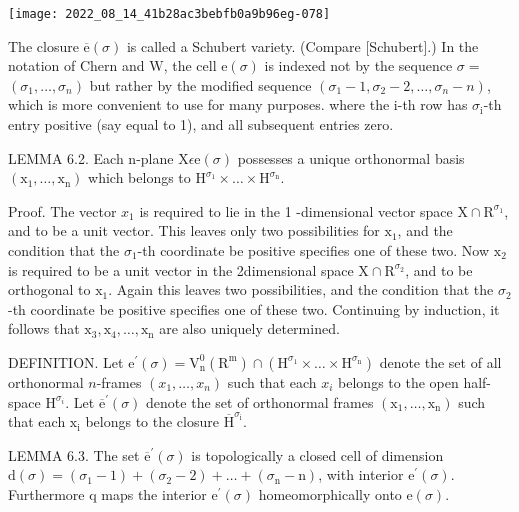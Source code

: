\documentclass[10pt]{article}
\begin{document}
\texttt{[image: 2022\_08\_14\_41b28ac3bebfb0a9b96eg-078]}

The closure $\overline{\mathrm{e}}(\sigma)$ is called a Schubert variety. (Compare [Schubert].) In the notation of Chern and $\mathrm{W}$, the cell $\mathrm{e}(\sigma)$ is indexed not by the sequence $\sigma=$ $\left(\sigma_{1}, \ldots, \sigma_{n}\right)$ but rather by the modified sequence $\left(\sigma_{1}-1, \sigma_{2}-2, \ldots, \sigma_{n}-n\right)$, which is more convenient to use for many purposes. where the $\mathrm{i}$-th row has $\sigma_{\mathrm{i}}$-th entry positive (say equal to 1), and all subsequent entries zero.

LEMMA 6.2. Each n-plane $\mathrm{X} \epsilon \mathrm{e}(\sigma)$ possesses a unique orthonormal basis $\left(\mathrm{x}_{1}, \ldots, \mathrm{x}_{\mathrm{n}}\right)$ which belongs to $\mathrm{H}^{\sigma_{1}} \times \ldots \times \mathrm{H}^{\sigma_{\mathrm{n}}}$.

Proof. The vector $x_{1}$ is required to lie in the 1 -dimensional vector space $\mathrm{X} \cap \mathrm{R}^{\sigma_{1}}$, and to be a unit vector. This leaves only two possibilities for $\mathrm{x}_{1}$, and the condition that the $\sigma_{1}$-th coordinate be positive specifies one of these two. Now $\mathrm{x}_{2}$ is required to be a unit vector in the 2dimensional space $\mathrm{X} \cap \mathrm{R}^{\sigma_{2}}$, and to be orthogonal to $\mathrm{x}_{1}$. Again this leaves two possibilities, and the condition that the $\sigma_{2}$-th coordinate be positive specifies one of these two. Continuing by induction, it follows that $\mathrm{x}_{3}, \mathrm{x}_{4}, \ldots, \mathrm{x}_{\mathrm{n}}$ are also uniquely determined.

DEFINITION. Let $\mathrm{e}^{\prime}(\sigma)=\mathrm{V}_{\mathrm{n}}^{0}\left(\mathrm{R}^{\mathrm{m}}\right) \cap\left(\mathrm{H}^{\sigma_{1}} \times \ldots \times \mathrm{H}^{\sigma_{\mathrm{n}}}\right)$ denote the set of all orthonormal $n$-frames $\left(x_{1}, \ldots, x_{n}\right)$ such that each $x_{i}$ belongs to the open half-space $\mathrm{H}^{\sigma_{i}}$. Let $\overline{\mathrm{e}}^{\prime}(\sigma)$ denote the set of orthonormal frames $\left(\mathrm{x}_{1}, \ldots, \mathrm{x}_{\mathrm{n}}\right)$ such that each $\mathrm{x}_{\mathrm{i}}$ belongs to the closure $\overline{\mathrm{H}}^{\sigma_{\mathrm{i}}}$.

LEMMA 6.3. The set $\overline{\mathrm{e}}^{\prime}(\sigma)$ is topologically a closed cell of dimension $\mathrm{d}(\sigma)=\left(\sigma_{1}-1\right)+\left(\sigma_{2}-2\right)+\ldots+\left(\sigma_{\mathrm{n}}-\mathrm{n}\right)$, with interior $\mathrm{e}^{\prime}(\sigma)$. Furthermore q maps the interior $\mathrm{e}^{\prime}(\sigma)$ homeomorphically onto $\mathrm{e}(\sigma)$.
\end{document}
